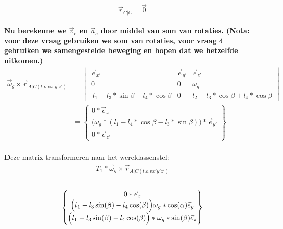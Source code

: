 \documentclass[a4paper,10pt]{article}
\begin{document}
\begin{equation}
	\vec{r}_{C|C} = \vec{0}
\end{equation}\\
\textbf{Nu berekenne we $\vec{v}_c$ en $\vec{a}_c$ door middel van som van rotaties. (Nota: voor deze vraag gebruiken we som van rotaties, voor vraag 4 gebruiken we samengestelde beweging en hopen dat we hetzelfde uitkomen.)}
\begin{equation}
	\begin{aligned}
		\vec{\omega}_g \times \vec{r}_{A|C(t.o.v x'y'z')} & = \begin{vmatrix}
			\vec{e}_{x'}& \vec{e}_{y'} & \vec{e}_{z'}\\
			0 & 0 & \omega_g \\
			\ l_1 - l_3 * \sin{\beta} - l_4*\cos{\beta} & 0 & l_2 - l_3 * \cos{\beta} + l_4 * \cos{\beta}\end{vmatrix}\\
		&= \begin{Bmatrix}
			0 *\vec{e}_{x'}\\
			\Big(\omega_g*(l_1-l_4*\cos{\beta} - l_3 * \sin{\beta})\Big)*\vec{e}_{y'}\\
			0 * \vec{e}_{z'}
		\end{Bmatrix}
	\end{aligned}
\end{equation}\\
\textbf Deze matrix transformeren naar het wereldassenstel:\
\begin{equation}
	\begin{aligned}
		{T}_{1}* \vec{\omega}_g \times \vec{r}_{A|C(t.o.v x'y'z')}
	\end{aligned}
\end{equation}\\
\begin{equation}
	\begin{Bmatrix}
		{0*\vec{e}_{x}}\\
		\Big(l_1-l_3\sin(\beta)-l_4\cos(\beta)\Big)\omega_g*\cos(\alpha) \vec{e}_{y}\\
		\Big{(l_1-l_3\sin(\beta)-l_4\cos(\beta)\Big)*\omega_g*\sin(\beta)\vec{e}_{z}}
	\end{Bmatrix}
\end{equation}\\
\end{document}
